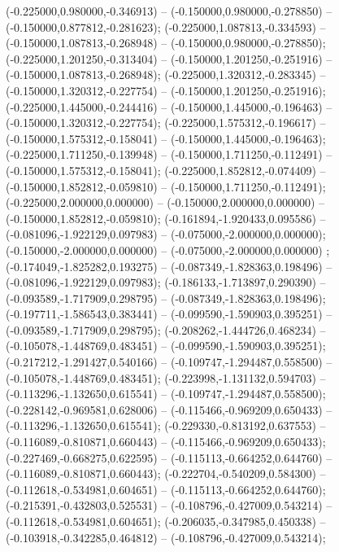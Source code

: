  (-0.225000,0.980000,-0.346913) -- (-0.150000,0.980000,-0.278850) -- (-0.150000,0.877812,-0.281623);
 (-0.225000,1.087813,-0.334593) -- (-0.150000,1.087813,-0.268948) -- (-0.150000,0.980000,-0.278850);
 (-0.225000,1.201250,-0.313404) -- (-0.150000,1.201250,-0.251916) -- (-0.150000,1.087813,-0.268948);
 (-0.225000,1.320312,-0.283345) -- (-0.150000,1.320312,-0.227754) -- (-0.150000,1.201250,-0.251916);
 (-0.225000,1.445000,-0.244416) -- (-0.150000,1.445000,-0.196463) -- (-0.150000,1.320312,-0.227754);
 (-0.225000,1.575312,-0.196617) -- (-0.150000,1.575312,-0.158041) -- (-0.150000,1.445000,-0.196463);
 (-0.225000,1.711250,-0.139948) -- (-0.150000,1.711250,-0.112491) -- (-0.150000,1.575312,-0.158041);
 (-0.225000,1.852812,-0.074409) -- (-0.150000,1.852812,-0.059810) -- (-0.150000,1.711250,-0.112491);
 (-0.225000,2.000000,0.000000) -- (-0.150000,2.000000,0.000000) -- (-0.150000,1.852812,-0.059810);
 (-0.161894,-1.920433,0.095586) -- (-0.081096,-1.922129,0.097983) -- (-0.075000,-2.000000,0.000000);
 (-0.150000,-2.000000,0.000000) -- (-0.075000,-2.000000,0.000000) ;
 (-0.174049,-1.825282,0.193275) -- (-0.087349,-1.828363,0.198496) -- (-0.081096,-1.922129,0.097983);
 (-0.186133,-1.713897,0.290390) -- (-0.093589,-1.717909,0.298795) -- (-0.087349,-1.828363,0.198496);
 (-0.197711,-1.586543,0.383441) -- (-0.099590,-1.590903,0.395251) -- (-0.093589,-1.717909,0.298795);
 (-0.208262,-1.444726,0.468234) -- (-0.105078,-1.448769,0.483451) -- (-0.099590,-1.590903,0.395251);
 (-0.217212,-1.291427,0.540166) -- (-0.109747,-1.294487,0.558500) -- (-0.105078,-1.448769,0.483451);
 (-0.223998,-1.131132,0.594703) -- (-0.113296,-1.132650,0.615541) -- (-0.109747,-1.294487,0.558500);
 (-0.228142,-0.969581,0.628006) -- (-0.115466,-0.969209,0.650433) -- (-0.113296,-1.132650,0.615541);
 (-0.229330,-0.813192,0.637553) -- (-0.116089,-0.810871,0.660443) -- (-0.115466,-0.969209,0.650433);
 (-0.227469,-0.668275,0.622595) -- (-0.115113,-0.664252,0.644760) -- (-0.116089,-0.810871,0.660443);
 (-0.222704,-0.540209,0.584300) -- (-0.112618,-0.534981,0.604651) -- (-0.115113,-0.664252,0.644760);
 (-0.215391,-0.432803,0.525531) -- (-0.108796,-0.427009,0.543214) -- (-0.112618,-0.534981,0.604651);
 (-0.206035,-0.347985,0.450338) -- (-0.103918,-0.342285,0.464812) -- (-0.108796,-0.427009,0.543214);
